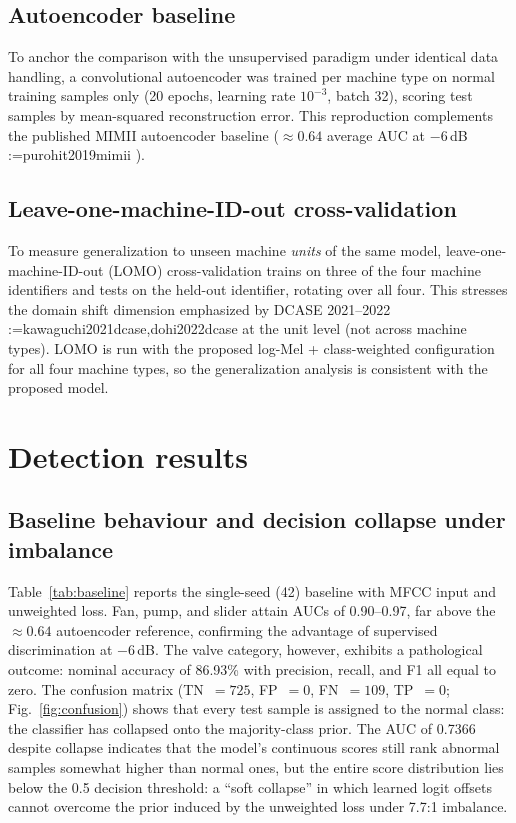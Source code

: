 \documentclass[review,nopreprintline]{elsarticle}
\makeatletter
\newif\ifmc@notfirst
\let\@oldcite\cite
\def\mc@splitcite#1{%
    \begingroup
    \mc@notfirstfalse
    \@for\@citekey:=#1\do{%
      \ifmc@notfirst, \fi
      \mc@notfirsttrue
      \@oldcite{\@citekey}%
    }%
    \endgroup
  }%
\def\cite#1{\protect\mc@splitcite{#1}}%
\makeatother
\begin{document}
\subsection{Autoencoder baseline}
\label{sec:ae-method}
To anchor the comparison with the unsupervised paradigm under identical data handling, a convolutional autoencoder was trained per machine type on normal training samples only (20 epochs, learning rate $10^{-3}$, batch 32), scoring test samples by mean-squared reconstruction error. This reproduction complements the published MIMII autoencoder baseline ($\approx0.64$ average AUC at $-6$\,dB~\cite{purohit2019mimii}).

\subsection{Leave-one-machine-ID-out cross-validation}
\label{sec:lomo-method}
To measure generalization to unseen machine \emph{units} of the same model, leave-one-machine-ID-out (LOMO) cross-validation trains on three of the four machine identifiers and tests on the held-out identifier, rotating over all four. This stresses the domain shift dimension emphasized by DCASE 2021--2022~\cite{kawaguchi2021dcase,dohi2022dcase} at the unit level (not across machine types). LOMO is run with the proposed log-Mel + class-weighted configuration for all four machine types, so the generalization analysis is consistent with the proposed model.

\section{Detection results}
\label{sec:results}

\subsection{Baseline behaviour and decision collapse under imbalance}
\label{sec:collapse}

Table~\ref{tab:baseline} reports the single-seed (42) baseline with MFCC input and unweighted loss. Fan, pump, and slider attain AUCs of 0.90--0.97, far above the $\approx0.64$ autoencoder reference, confirming the advantage of supervised discrimination at $-6$\,dB. The valve category, however, exhibits a pathological outcome: nominal accuracy of 86.93\% with precision, recall, and F1 all equal to zero. The confusion matrix (TN~$=725$, FP~$=0$, FN~$=109$, TP~$=0$; Fig.~\ref{fig:confusion}) shows that every test sample is assigned to the normal class: the classifier has collapsed onto the majority-class prior. The AUC of 0.7366 despite collapse indicates that the model's continuous scores still rank abnormal samples somewhat higher than normal ones, but the entire score distribution lies below the 0.5 decision threshold: a ``soft collapse'' in which learned logit offsets cannot overcome the prior induced by the unweighted loss under 7.7:1 imbalance.
\end{document}
